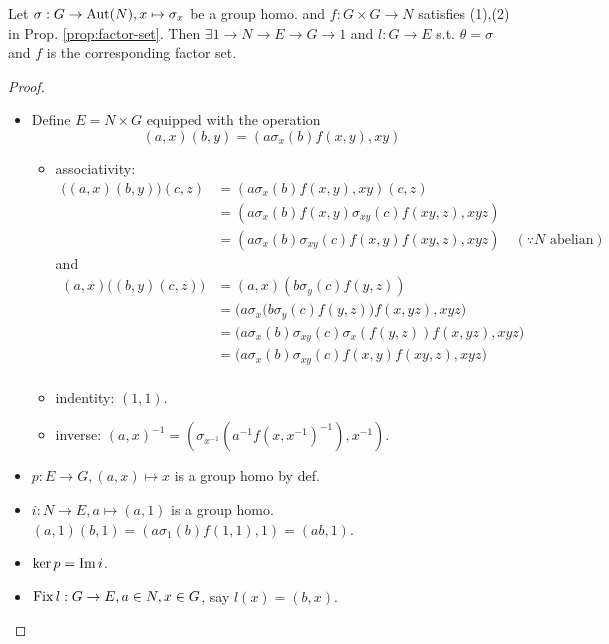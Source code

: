 \begin{theorem}
  Let $\sigma: G \to \operatorname{Aut}(N), x\mapsto \sigma_x$  be a group homo. and
  $f: G\times G\to N$ satisfies (1),(2) in Prop. \ref{prop:factor-set}.
  Then $\exists 1\to N\to E\to G\to 1$ and $l: G\to E$ s.t. $\theta = \sigma$
  and $f$ is the corresponding factor set.

  \begin{proof}
    \begin{itemize}
      \item Define $E = N \times G$ equipped with the operation
        \[
          (a, x)(b, y) = (a \sigma_{x}(b)f(x,y),
          xy)
        \]
        \begin{itemize}
          \item associativity:
            \begin{align*}
              \big( (a, x) (b, y) \big) (c, z) &= (a \sigma_x(b) f(x, y), xy) (c, z) \\
              &= (a \sigma_x(b) f(x, y) \sigma_{xy}(c) f(xy, z), xyz) \\
              &= (a \sigma_x(b) \sigma_{xy}(c) f(x, y) f(xy, z), xyz) \quad (\because N \text{ abelian})
            \end{align*}
            and
            \begin{align*}
              (a, x) \big( (b, y) (c, z) \big) &= (a, x) (b \sigma_y(c) f(y, z)) \\ 
              &= \big( a \sigma_x \big( b \sigma_y(c) f(y, z) \big) f(x, yz), xyz \big) \\
              &= \big( a \sigma_x ( b ) \sigma_{xy}(c) \sigma_x(f(y, z)) f(x, yz), xyz \big) \\
              &= \big( a \sigma_x ( b ) \sigma_{xy}(c) f(x, y) f(xy, z), xyz \big) \\
            \end{align*}
          \item indentity: $(1, 1)$.
          \item inverse: $(a, x)^{-1} =
            (\sigma_{x^{-1}}(a^{-1}f(x,x^{-1})^{-1}), x^{-1})$.
        \end{itemize}
      \item $p: E\to G, (a, x) \mapsto x$ is a group homo by def.
      \item $i: N\to E, a \mapsto (a, 1)$ is a group homo.
        $(a, 1)(b, 1) = (a\sigma_1(b)f(1, 1), 1) = (ab, 1)$.
      \item $\ker p = \operatorname{Im} i$.
      \item $\operatorname{Fix} l: G\to E, a\in N, x\in G$, say $l(x) = (b, x)$.

\end{itemize}
\end{proof}
\end{theorem}
